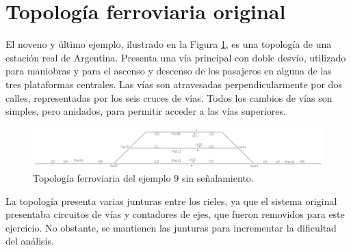 \section{Topología ferroviaria original}

	El noveno y último ejemplo, ilustrado en la Figura \ref{fig:EJ9_1}, es una topología de una estación real de Argentina. Presenta una vía principal con doble desvío, utilizado para maniobras y para el ascenso y descenso de los pasajeros en alguna de las tres plataformas centrales. Las vías son atravesadas perpendicularmente por dos calles, representadas por los seis cruces de vías. Todos los cambios de vías son simples, pero anidados, para permitir acceder a las vías superiores.	
	
	\begin{figure}[h]
		\centering
		\includegraphics[width=1\textwidth]{resultados-obtenidos/ejemplo9/images/9_empty.png}
		\centering\caption{Topología ferroviaria del ejemplo 9 sin señalamiento.}
		\label{fig:EJ9_1}
	\end{figure}
	
	La topología presenta varias junturas entre los rieles, ya que el sistema original presentaba circuitos de vías y contadores de ejes, que fueron removidos para este ejercicio. No obstante, se mantienen las junturas para incrementar la dificultad del análisis.